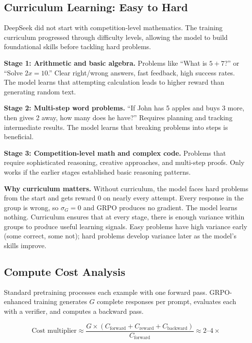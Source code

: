 \begin{chapterenv}
\subsection{Curriculum Learning: Easy to Hard}

DeepSeek did not start with competition-level mathematics. The training curriculum progressed through difficulty levels, allowing the model to build foundational skills before tackling hard problems.

\textbf{Stage 1: Arithmetic and basic algebra.} Problems like ``What is $5 + 7$?'' or ``Solve $2x = 10$.'' Clear right/wrong answers, fast feedback, high success rates. The model learns that attempting calculation leads to higher reward than generating random text.

\textbf{Stage 2: Multi-step word problems.} ``If John has 5 apples and buys 3 more, then gives 2 away, how many does he have?'' Requires planning and tracking intermediate results. The model learns that breaking problems into steps is beneficial.

\textbf{Stage 3: Competition-level math and complex code.} Problems that require sophisticated reasoning, creative approaches, and multi-step proofs. Only works if the earlier stages established basic reasoning patterns.

\begin{tipbox}
\textbf{Why curriculum matters.} Without curriculum, the model faces hard problems from the start and gets reward 0 on nearly every attempt. Every response in the group is wrong, so $\sigma_G = 0$ and GRPO produces no gradient. The model learns nothing. Curriculum ensures that at every stage, there is enough variance within groups to produce useful learning signals. Easy problems have high variance early (some correct, some not); hard problems develop variance later as the model's skills improve.
\end{tipbox}

\subsection{Compute Cost Analysis}

Standard pretraining processes each example with one forward pass. GRPO-enhanced training generates $G$ complete responses per prompt, evaluates each with a verifier, and computes a backward pass.

$$\text{Cost multiplier} \approx \frac{G \times (C_{\text{forward}} + C_{\text{reward}} + C_{\text{backward}})}{C_{\text{forward}}} \approx 2\text{--}4\times$$


\end{chapterenv}
